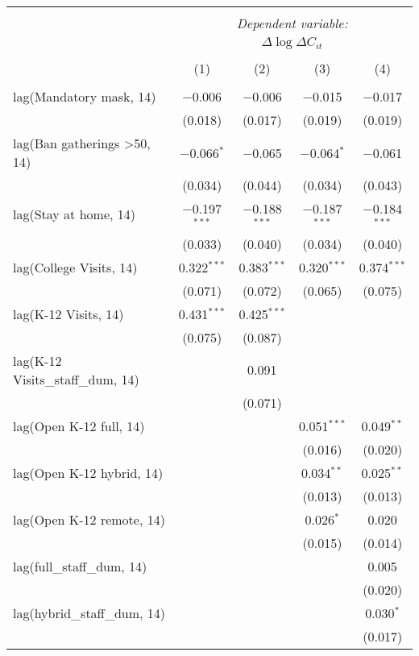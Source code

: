 \begin{tabular}{@{\extracolsep{1pt}}lcccc} 
\\[-1.8ex]\hline 
\hline \\[-1.8ex] 
 & \multicolumn{4}{c}{\textit{Dependent variable:}} \\ 
\cline{2-5} 
 & \multicolumn{4}{c}{$\Delta \log \Delta C_{it}$} \\ 
\\[-1.8ex] & (1) & (2) & (3) & (4)\\ 
\hline \\[-1.8ex] 
 lag(Mandatory mask, 14) & $-$0.006 & $-$0.006 & $-$0.015 & $-$0.017 \\ 
  & (0.018) & (0.017) & (0.019) & (0.019) \\ 
  lag(Ban gatherings >50, 14) & $-$0.066$^{*}$ & $-$0.065 & $-$0.064$^{*}$ & $-$0.061 \\ 
  & (0.034) & (0.044) & (0.034) & (0.043) \\ 
  lag(Stay at home, 14) & $-$0.197$^{***}$ & $-$0.188$^{***}$ & $-$0.187$^{***}$ & $-$0.184$^{***}$ \\ 
  & (0.033) & (0.040) & (0.034) & (0.040) \\ 
  lag(College Visits, 14) & 0.322$^{***}$ & 0.383$^{***}$ & 0.320$^{***}$ & 0.374$^{***}$ \\ 
  & (0.071) & (0.072) & (0.065) & (0.075) \\ 
  lag(K-12 Visits, 14) & 0.431$^{***}$ & 0.425$^{***}$ &  &  \\ 
  & (0.075) & (0.087) &  &  \\ 
  lag(K-12 Visits\_staff\_dum, 14) &  & 0.091 &  &  \\ 
  &  & (0.071) &  &  \\ 
  lag(Open K-12 full, 14) &  &  & 0.051$^{***}$ & 0.049$^{**}$ \\ 
  &  &  & (0.016) & (0.020) \\ 
  lag(Open K-12 hybrid, 14) &  &  & 0.034$^{**}$ & 0.025$^{**}$ \\ 
  &  &  & (0.013) & (0.013) \\ 
  lag(Open K-12 remote, 14) &  &  & 0.026$^{*}$ & 0.020 \\ 
  &  &  & (0.015) & (0.014) \\ 
  lag(full\_staff\_dum, 14) &  &  &  & 0.005 \\ 
  &  &  &  & (0.020) \\ 
  lag(hybrid\_staff\_dum, 14) &  &  &  & 0.030$^{*}$ \\ 
  &  &  &  & (0.017) \\ 

\end{tabular}
